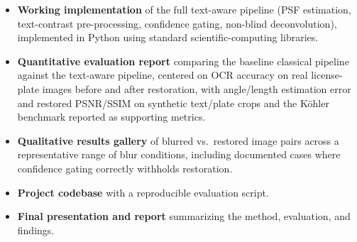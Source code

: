 \documentclass[11pt,a4paper]{article}
\begin{document}
\begin{itemize}
    \item \textbf{Working implementation} of the full text-aware pipeline (PSF
    estimation, text-contrast pre-processing, confidence gating, non-blind
    deconvolution), implemented in Python using standard scientific-computing
    libraries.
    \item \textbf{Quantitative evaluation report} comparing the baseline classical
    pipeline against the text-aware pipeline, centered on OCR accuracy on real
    license-plate images before and after restoration, with angle/length estimation
    error and restored PSNR/SSIM on synthetic text/plate crops and the Köhler
    benchmark reported as supporting metrics.
    \item \textbf{Qualitative results gallery} of blurred vs.\ restored image pairs across a
    representative range of blur conditions, including documented cases where
    confidence gating correctly withholds restoration.
    \item \textbf{Project codebase} with a reproducible evaluation script.
    \item \textbf{Final presentation and report} summarizing the method, evaluation, and
    findings.
\end{itemize}
\end{document}
